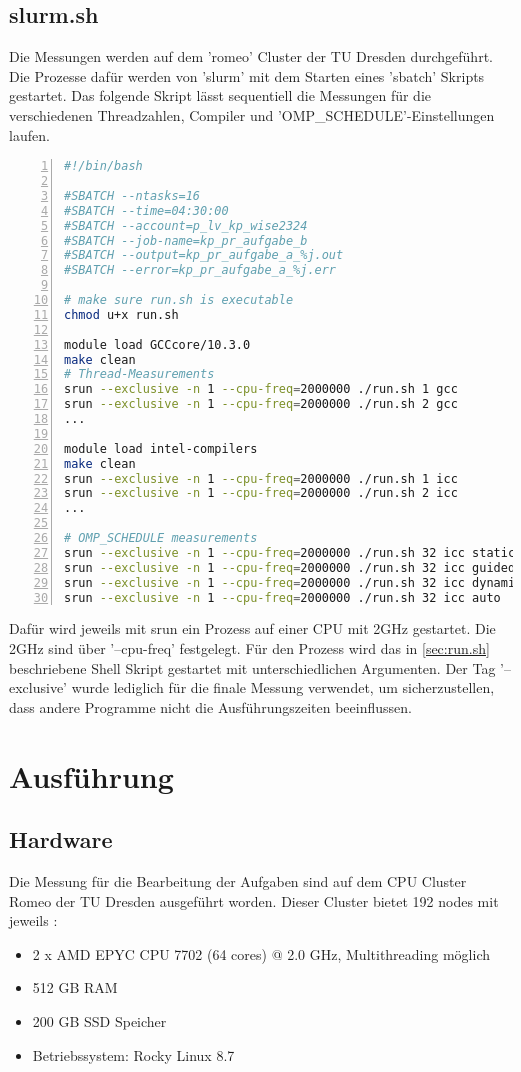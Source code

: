 \documentclass[plainarticle,zihtitle,german,final,hyperref,utf8]{zihpub}
\begin{document}
\subsection{slurm.sh}\label{sec:slurm.sh}
Die Messungen werden auf dem 'romeo' Cluster der TU Dresden durchgeführt. Die Prozesse dafür werden von 'slurm' mit dem Starten eines 'sbatch' Skripts gestartet. Das folgende Skript lässt sequentiell die Messungen für die verschiedenen Threadzahlen, Compiler und 'OMP\_SCHEDULE'-Einstellungen laufen.
\begin{lstlisting}[language=bash, numbers=left]
#!/bin/bash

#SBATCH --ntasks=16
#SBATCH --time=04:30:00
#SBATCH --account=p_lv_kp_wise2324
#SBATCH --job-name=kp_pr_aufgabe_b
#SBATCH --output=kp_pr_aufgabe_a_%j.out
#SBATCH --error=kp_pr_aufgabe_a_%j.err

# make sure run.sh is executable
chmod u+x run.sh

module load GCCcore/10.3.0
make clean
# Thread-Measurements
srun --exclusive -n 1 --cpu-freq=2000000 ./run.sh 1 gcc
srun --exclusive -n 1 --cpu-freq=2000000 ./run.sh 2 gcc
...

module load intel-compilers
make clean
srun --exclusive -n 1 --cpu-freq=2000000 ./run.sh 1 icc
srun --exclusive -n 1 --cpu-freq=2000000 ./run.sh 2 icc
...

# OMP_SCHEDULE measurements
srun --exclusive -n 1 --cpu-freq=2000000 ./run.sh 32 icc static
srun --exclusive -n 1 --cpu-freq=2000000 ./run.sh 32 icc guided
srun --exclusive -n 1 --cpu-freq=2000000 ./run.sh 32 icc dynamic
srun --exclusive -n 1 --cpu-freq=2000000 ./run.sh 32 icc auto
\end{lstlisting}
Dafür wird jeweils mit srun ein Prozess auf einer CPU mit 2GHz gestartet. Die 2GHz sind über '--cpu-freq' festgelegt. Für den Prozess wird das in \ref{sec:run.sh} beschriebene Shell Skript gestartet mit unterschiedlichen Argumenten.
Der Tag '--exclusive' wurde lediglich für die finale Messung verwendet, um sicherzustellen, dass andere Programme nicht die Ausführungszeiten beeinflussen.
\section{Ausführung}
\subsection{Hardware}
Die Messung für die Bearbeitung der Aufgaben sind auf dem CPU Cluster Romeo der TU Dresden ausgeführt worden. Dieser Cluster bietet 192 nodes mit jeweils \cite{hpc_compendium}:
\begin{itemize}
	\item 2 x AMD EPYC CPU 7702 (64 cores) @ 2.0 GHz, Multithreading möglich
	\item 512 GB RAM
	\item 200 GB SSD Speicher
	\item Betriebssystem: Rocky Linux 8.7
\end{itemize}
\end{document}
